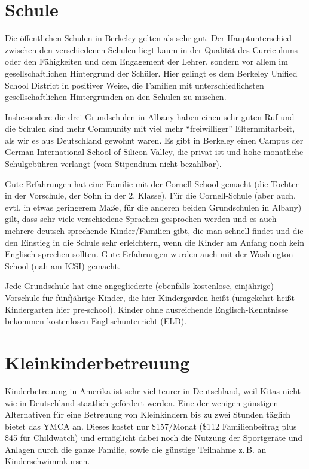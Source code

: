 \documentclass[a4paper]{scrreprt}
\begin{document}
\section{Schule}

Die öffentlichen Schulen in Berkeley gelten als sehr gut. Der Hauptunterschied zwischen den verschiedenen Schulen liegt kaum in der Qualität des Curriculums oder den Fähigkeiten und dem Engagement der Lehrer, sondern vor allem im gesellschaftlichen Hintergrund der Schüler. Hier gelingt es dem Berkeley Unified School District in positiver Weise, die Familien mit unterschiedlichsten gesellschaftlichen Hintergründen an den Schulen zu mischen.

Insbesondere die drei Grundschulen in Albany haben einen sehr guten Ruf und die Schulen sind mehr Community mit viel mehr "`freiwilliger"' Elternmitarbeit, als wir es aus Deutschland gewohnt waren.
Es gibt in Berkeley einen Campus der German International School of Silicon Valley, die privat ist und hohe monatliche Schulgebühren verlangt (vom Stipendium nicht bezahlbar).

Gute Erfahrungen hat eine Familie mit der Cornell School gemacht (die Tochter in der Vorschule, der Sohn in der 2. Klasse).
Für die Cornell-Schule (aber auch, evtl. in etwas geringerem Maße, für die anderen beiden Grundschulen in Albany) gilt,
dass sehr viele verschiedene Sprachen gesprochen werden 
und es auch mehrere deutsch-sprechende Kinder/Familien gibt, 
die man schnell findet und die den Einstieg in die Schule sehr erleichtern, 
wenn die Kinder am Anfang noch kein Englisch sprechen sollten.
Gute Erfahrungen wurden auch mit der Washington-School (nah am ICSI) gemacht.

Jede Grundschule hat eine angegliederte (ebenfalls kostenlose, einjährige) Vorschule für fünfjährige Kinder, 
die hier Kindergarden heißt (umgekehrt heißt Kindergarten hier pre-school).
Kinder ohne ausreichende Englisch-Kenntnisse bekommen kostenlosen Englischunterricht (ELD).

\section{Kleinkinderbetreuung}

Kinderbetreuung in Amerika ist sehr viel teurer in Deutschland, weil Kitas nicht wie in Deutschland staatlich gefördert werden.
Eine der wenigen günstigen Alternativen für eine Betreuung von Kleinkindern bis zu zwei Stunden 
täglich bietet das YMCA an.
Dieses kostet nur \$157/Monat (\$112 Familienbeitrag plus \$45 für Childwatch) 
und ermöglicht dabei noch die Nutzung der Sportgeräte und Anlagen durch die ganze Familie, 
sowie die günstige Teilnahme z.\,B. an Kinderschwimmkursen.
\end{document}
